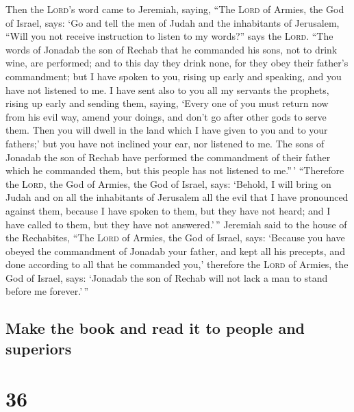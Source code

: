  Then the \textsc{Lord}'s word came to Jeremiah, saying,
 ``The \textsc{Lord} of Armies, the God of Israel, says:
`Go and tell the men of Judah and the inhabitants of Jerusalem, ``Will
you not receive instruction to listen to my words?'' says the
\textsc{Lord}.  ``The words of Jonadab the son of Rechab
that he commanded his sons, not to drink wine, are performed; and to
this day they drink none, for they obey their father's commandment; but
I have spoken to you, rising up early and speaking, and you have not
listened to me.  I have sent also to you all my servants
the prophets, rising up early and sending them, saying, `Every one of
you must return now from his evil way, amend your doings, and don't go
after other gods to serve them. Then you will dwell in the land which I
have given to you and to your fathers;' but you have not inclined your
ear, nor listened to me.  The sons of Jonadab the son of
Rechab have performed the commandment of their father which he commanded
them, but this people has not listened to me.''\,' 
``Therefore the \textsc{Lord}, the God of Armies, the God of Israel,
says: `Behold, I will bring on Judah and on all the inhabitants of
Jerusalem all the evil that I have pronounced against them, because I
have spoken to them, but they have not heard; and I have called to them,
but they have not answered.'\,''  Jeremiah said to the
house of the Rechabites, ``The \textsc{Lord} of Armies, the God of
Israel, says: `Because you have obeyed the commandment of Jonadab your
father, and kept all his precepts, and done according to all that he
commanded you,'  therefore the \textsc{Lord} of Armies,
the God of Israel, says: `Jonadab the son of Rechab will not lack a man
to stand before me forever.'\,''

\hypertarget{make-the-book-and-read-it-to-people-and-superiors}{%
\subsection{Make the book and read it to people and
superiors}\label{make-the-book-and-read-it-to-people-and-superiors}}

\hypertarget{section-35}{%
\section{36}\label{section-35}}

